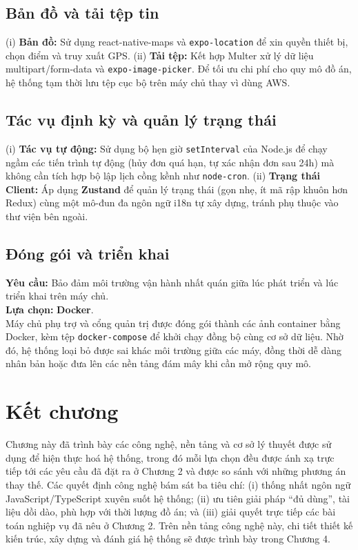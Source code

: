 \documentclass[../main.tex]{subfiles}%
\begin{document}
\subsection{Bản đồ và tải tệp tin}
(i) \textbf{Bản đồ:} Sử dụng react-native-maps và \texttt{expo-location} để xin quyền thiết bị, chọn điểm và truy xuất GPS.
(ii) \textbf{Tải tệp:} Kết hợp Multer xử lý dữ liệu multipart/form-data và \texttt{expo-image-picker}. Để tối ưu chi phí cho quy mô đồ án, hệ thống tạm thời lưu tệp cục bộ trên máy chủ thay vì dùng AWS.

\subsection{Tác vụ định kỳ và quản lý trạng thái}
(i) \textbf{Tác vụ tự động:} Sử dụng bộ hẹn giờ \texttt{setInterval} của Node.js để chạy ngầm các tiến trình tự động (hủy đơn quá hạn, tự xác nhận đơn sau 24h) mà không cần tích hợp bộ lập lịch cồng kềnh như \texttt{node-cron}.
(ii) \textbf{Trạng thái Client:} Áp dụng \textbf{Zustand} để quản lý trạng thái (gọn nhẹ, ít mã rập khuôn hơn Redux) cùng một mô-đun đa ngôn ngữ i18n tự xây dựng, tránh phụ thuộc vào thư viện bên ngoài.

\subsection{Đóng gói và triển khai}
\textbf{Yêu cầu:} Bảo đảm môi trường vận hành nhất quán giữa lúc phát triển và lúc triển khai trên máy chủ.\\
\textbf{Lựa chọn:} \textbf{Docker}.\\
Máy chủ phụ trợ và cổng quản trị được đóng gói thành các ảnh container bằng Docker, kèm tệp \texttt{docker-compose} để khởi chạy đồng bộ cùng cơ sở dữ liệu. Nhờ đó, hệ thống loại bỏ được sai khác môi trường giữa các máy, đồng thời dễ dàng nhân bản hoặc đưa lên các nền tảng đám mây khi cần mở rộng quy mô.

\section{Kết chương}
Chương này đã trình bày các công nghệ, nền tảng và cơ sở lý thuyết được sử dụng để hiện thực hoá hệ thống, trong đó mỗi lựa chọn đều được ánh xạ trực tiếp tới các yêu cầu đã đặt ra ở Chương 2 và được so sánh với những phương án thay thế. Các quyết định công nghệ bám sát ba tiêu chí: (i) thống nhất ngôn ngữ JavaScript/TypeScript xuyên suốt hệ thống; (ii) ưu tiên giải pháp ``đủ dùng'', tài liệu dồi dào, phù hợp với thời lượng đồ án; và (iii) giải quyết trực tiếp các bài toán nghiệp vụ đã nêu ở Chương 2. Trên nền tảng công nghệ này, chi tiết thiết kế kiến trúc, xây dựng và đánh giá hệ thống sẽ được trình bày trong Chương 4.
\end{document}
